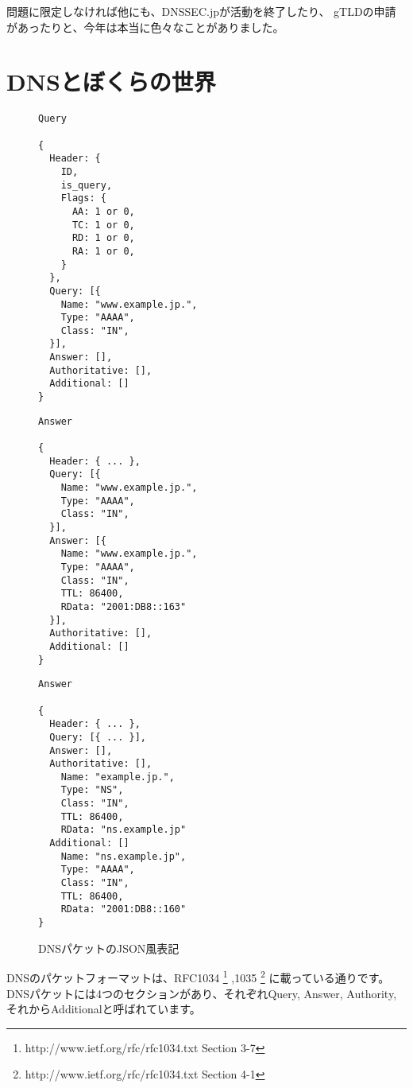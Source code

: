 問題に限定しなければ他にも、DNSSEC.jpが活動を終了したり、
gTLDの申請があったりと、今年は本当に色々なことがありました。




\section{DNSとぼくらの世界}


\begin{figure}[hbt]
\begin{minipage}{0.3\hsize}
{\scriptsize
\begin{verbatim}
Query

{
  Header: {
    ID,
    is_query,
    Flags: {
      AA: 1 or 0,
      TC: 1 or 0,
      RD: 1 or 0,
      RA: 1 or 0,
    }
  },
  Query: [{
    Name: "www.example.jp.",
    Type: "AAAA",
    Class: "IN",
  }],
  Answer: [],
  Authoritative: [],
  Additional: []
}
\end{verbatim}
}
\end{minipage}
\begin{minipage}{0.3\hsize}
{\scriptsize
\begin{verbatim}
Answer

{
  Header: { ... },
  Query: [{
    Name: "www.example.jp.",
    Type: "AAAA",
    Class: "IN",
  }],
  Answer: [{
    Name: "www.example.jp.",
    Type: "AAAA",
    Class: "IN",
    TTL: 86400,
    RData: "2001:DB8::163"
  }],
  Authoritative: [],
  Additional: []
}
\end{verbatim}
}
\end{minipage}
\begin{minipage}{0.3\hsize}
{\scriptsize
\begin{verbatim}
Answer

{
  Header: { ... },
  Query: [{ ... }],
  Answer: [],
  Authoritative: [],
    Name: "example.jp.",
    Type: "NS",
    Class: "IN",
    TTL: 86400,
    RData: "ns.example.jp"
  Additional: []
    Name: "ns.example.jp",
    Type: "AAAA",
    Class: "IN",
    TTL: 86400,
    RData: "2001:DB8::160"
}
\end{verbatim}
}
\end{minipage}
\caption{
DNSパケットのJSON風表記
}
\label{jsondns}
\end{figure}


DNSのパケットフォーマットは、RFC1034
\footnote{http://www.ietf.org/rfc/rfc1034.txt Section 3-7}
,1035 
\footnote{http://www.ietf.org/rfc/rfc1034.txt Section 4-1}
に載っている通りです。
DNSパケットには4つのセクションがあり、それぞれQuery, Answer, Authority,
それからAdditionalと呼ばれています。

